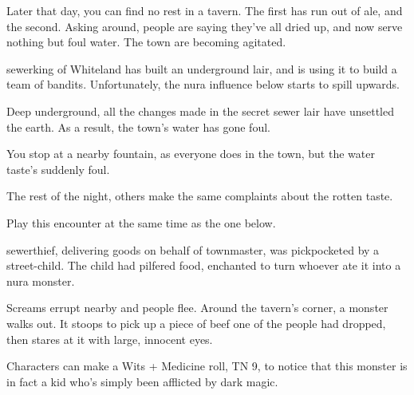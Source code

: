 \begin{multicols}{2}
\begin{boxtext}

	Later that day, you can find no rest in a tavern.  The first has run out of ale, and the second.  Asking around, people are saying they've all dried up, and now serve nothing but foul water.  The town are becoming agitated.

\end{boxtext}

\stopcontents[sq]

\label{sewerbandits}

\startcontents[sq]


\Gls{sewerking} of Whiteland has built an underground lair, and is using it to build a team of bandits.
Unfortunately, the nura influence below starts to spill upwards.


Deep underground, all the changes made in the secret sewer lair have unsettled the earth.
As a result, the town's water has gone foul.

\begin{boxtext}

	You stop at a nearby fountain, as everyone does in the town, but the water taste's suddenly foul.

	The rest of the night, others make the same complaints about the rotten taste.

\end{boxtext}

Play this encounter at the same time as the one below.

\Gls{sewerthief}, delivering goods on behalf of \gls{townmaster}, was pickpocketed by a street-child.
The child had pilfered food, enchanted to turn whoever ate it into a nura monster.

\begin{boxtext}

	Screams errupt nearby and people flee.  Around the tavern's corner, a monster walks out.  It stoops to pick up a piece of beef one of the people had dropped, then stares at it with large, innocent eyes.

\end{boxtext}

Characters can make a Wits + Medicine roll, TN 9, to notice that this monster is in fact a kid who's simply been afflicted by dark magic.


\end{multicols}
